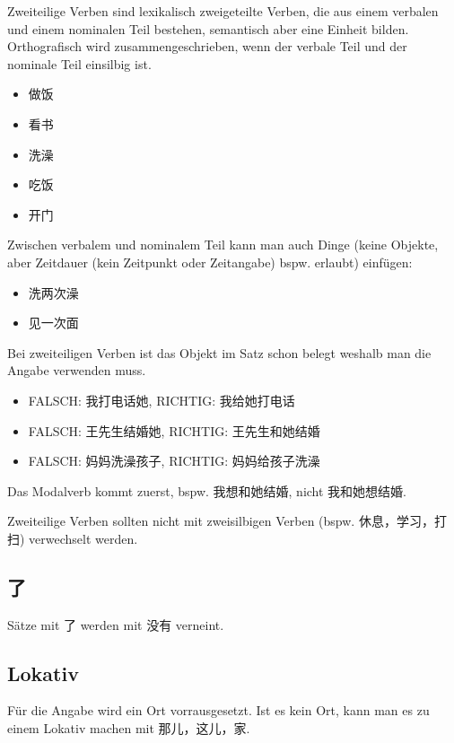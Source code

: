 \documentclass[UTF8]{ctexart}
\begin{document}
Zweiteilige Verben sind lexikalisch zweigeteilte Verben, die aus einem verbalen und einem nominalen Teil bestehen, semantisch aber eine Einheit bilden. Orthografisch wird zusammengeschrieben, wenn der verbale Teil und der nominale Teil
einsilbig ist.

\begin{itemize}
    \item 做饭
    \item 看书
    \item 洗澡
    \item 吃饭
    \item 开门
\end{itemize}

Zwischen verbalem und nominalem Teil kann man auch Dinge (keine Objekte, aber Zeitdauer (kein Zeitpunkt oder Zeitangabe) bspw. erlaubt) einfügen:

\begin{itemize}
    \item 洗两次澡
    \item 见一次面
\end{itemize}

Bei zweiteiligen Verben ist das Objekt im Satz schon belegt weshalb man die Angabe verwenden muss.

\begin{itemize}
    \item FALSCH: 我打电话她, RICHTIG: 我给她打电话
    \item FALSCH: 王先⽣结婚她, RICHTIG: 王先⽣和她结婚
    \item FALSCH: 妈妈洗澡孩⼦, RICHTIG: 妈妈给孩⼦洗澡
\end{itemize}

Das Modalverb kommt zuerst, bspw. 我想和她结婚, nicht 我和她想结婚.

Zweiteilige Verben sollten nicht mit zweisilbigen Verben (bspw. 休息，学习，打扫) verwechselt werden.

\subsection{了}

Sätze mit 了 werden mit 没有 verneint.

\subsection{Lokativ}

Für die Angabe wird ein Ort vorrausgesetzt. Ist es kein Ort, kann man es zu einem Lokativ machen mit 那儿，这儿，家.
\end{document}
